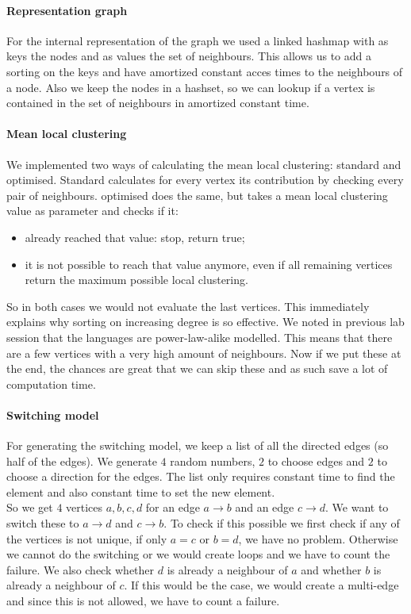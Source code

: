 \documentclass[paper=a4, fontsize=11pt]{scrartcl} %
\begin{document}
\paragraph{Representation graph}
For the internal representation of the graph we used a linked hashmap with as keys the nodes and as values the set of neighbours. This allows us to add a sorting on the keys and have amortized constant acces times to the neighbours of a node. Also we keep the nodes in a hashset, so we can lookup if a vertex is contained in the set of neighbours in amortized constant time.

\paragraph{Mean local clustering}
We implemented two ways of calculating the mean local clustering: standard and optimised. Standard calculates for every vertex its contribution by checking every pair of neighbours. optimised does the same, but takes a mean local clustering value as parameter and checks if it:
\begin{itemize}
\item already reached that value: stop, return true;
\item it is not possible to reach that value anymore, even if all remaining vertices return the maximum possible local clustering.
\end{itemize}
So in both cases we would not evaluate the last vertices. This immediately explains why sorting on increasing degree is so effective. We noted in previous lab session that the languages are power-law-alike modelled. This means that there are a few vertices with a very high amount of neighbours. Now if we put these at the end, the chances are great that we can skip these and as such save a lot of computation time.

\paragraph{Switching model}
For generating the switching model, we keep a list of all the directed edges (so half of the edges). We generate $4$ random numbers, $2$ to choose edges and $2$ to choose a direction for the edges. The list only requires constant time to find the element and also constant time to set the new element.\\

So we get $4$ vertices $a,b,c,d$ for an edge $a\rightarrow b$ and an edge $c\rightarrow d$. We want to switch these to $a\rightarrow d$ and $c \rightarrow b$. To check if this possible we first check if any of the vertices is not unique, if only $a=c$ or $b=d$, we have no problem. Otherwise we cannot do the switching or we would create loops and we have to count the failure.
We also check whether $d$ is already a neighbour of $a$ and whether $b$ is already a neighbour of $c$. If this would be the case, we would create a multi-edge and since this is not allowed, we have to count a failure.\\
\end{document}
